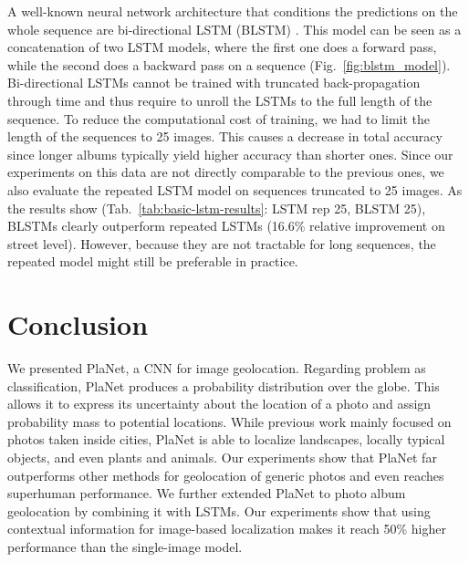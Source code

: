 \documentclass[10pt,twocolumn,letterpaper]{article}
\begin{document}
A well-known neural network architecture that conditions the predictions on the whole sequence are bi-directional LSTM (BLSTM) \cite{Graves05NN}. This model can be seen as a concatenation of two LSTM models, where the first one does a forward pass, while the second does a backward pass on a sequence (Fig.~\ref{fig:blstm_model}). Bi-directional LSTMs cannot be trained with truncated back-propagation through time \cite{Elman90CS} and thus require to unroll the LSTMs to the full length of the sequence. To reduce the computational cost of training, we had to limit the length of the sequences to 25 images. This causes a decrease in total accuracy since longer albums typically yield higher accuracy than shorter ones. Since our experiments on this data are not directly comparable to the previous ones, we also evaluate the repeated LSTM model on sequences truncated to 25 images. As the results show (Tab.~\ref{tab:basic-lstm-results}: LSTM rep 25, BLSTM 25), BLSTMs clearly outperform repeated LSTMs (16.6\% relative improvement on street level). However, because they are not tractable for long sequences, the repeated model might still be preferable in practice.

\section{Conclusion}
We presented PlaNet, a CNN for image geolocation. Regarding problem as classification, PlaNet produces a probability distribution over the globe. This allows it to express its uncertainty about the location of a photo and assign probability mass to potential locations. While previous work mainly focused on photos taken inside cities, PlaNet is able to localize landscapes, locally typical objects, and even plants and animals. Our experiments show that PlaNet far outperforms other methods for geolocation of generic photos and even reaches superhuman performance.
We further extended PlaNet to photo album geolocation by combining it with LSTMs. Our experiments show that using contextual information for image-based localization makes it reach 50\% higher performance than the single-image model.

{\small


}
\end{document}
